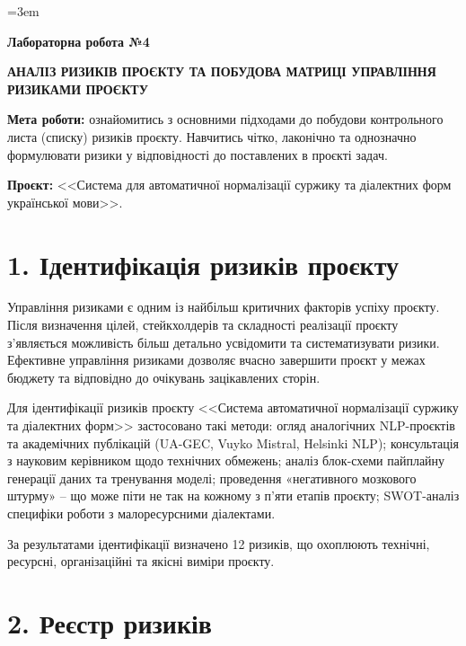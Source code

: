 \documentclass[14pt]{extarticle}
\begin{document}
\sloppy
\emergencystretch=3em
\setlength{\tabcolsep}{4pt}

\begin{center}
\textbf{Лабораторна робота №4}

\medskip

\textbf{\MakeUppercase{Аналіз ризиків проєкту та побудова матриці управління ризиками проєкту}}
\end{center}

\medskip

\textbf{Мета роботи:} ознайомитись з основними підходами до побудови контрольного листа (списку) ризиків проєкту. Навчитись чітко, лаконічно та однозначно формулювати ризики у відповідності до поставлених в проєкті задач.

\textbf{Проєкт:} <<Система для автоматичної нормалізації суржику та діалектних форм української мови>>.

\section*{1. Ідентифікація ризиків проєкту}

Управління ризиками є одним із найбільш критичних факторів успіху проєкту. Після визначення цілей, стейкхолдерів та складності реалізації проєкту з'являється можливість більш детально усвідомити та систематизувати ризики. Ефективне управління ризиками дозволяє вчасно завершити проєкт у межах бюджету та відповідно до очікувань зацікавлених сторін.

Для ідентифікації ризиків проєкту <<Система автоматичної нормалізації суржику та діалектних форм>> застосовано такі методи: огляд аналогічних NLP-проєктів та академічних публікацій (UA-GEC, Vuyko Mistral, Helsinki NLP); консультація з науковим керівником щодо технічних обмежень; аналіз блок-схеми пайплайну генерації даних та тренування моделі; проведення «негативного мозкового штурму» -- що може піти не так на кожному з п'яти етапів проєкту; SWOT-аналіз специфіки роботи з малоресурсними діалектами.

За результатами ідентифікації визначено 12 ризиків, що охоплюють технічні, ресурсні, організаційні та якісні виміри проєкту.

\section*{2. Реєстр ризиків}
\end{document}
